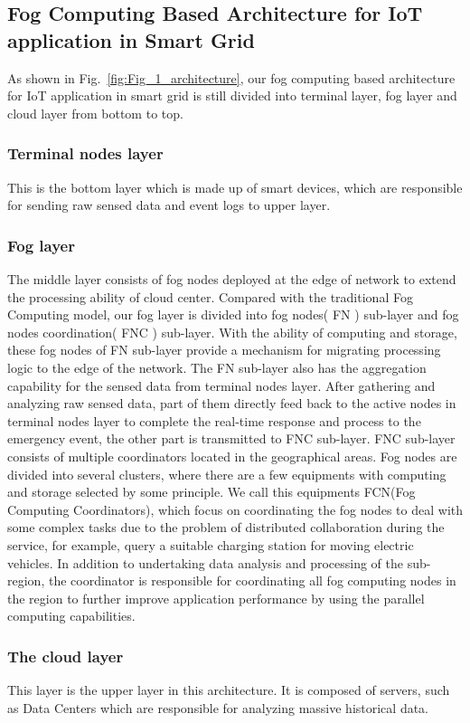\documentclass[conference]{IEEEtran}
\begin{document}
\subsection{Fog Computing Based Architecture for IoT application in Smart Grid}
As shown in Fig.~\ref{fig:Fig_1_architecture}, our fog computing based architecture for IoT application in smart grid is still divided into terminal layer, fog layer and cloud layer from bottom to top. 
\subsubsection{Terminal nodes layer} This is the bottom layer which is made up of smart devices, which are responsible for sending raw sensed data and event logs to upper layer.
\subsubsection{Fog layer} The middle layer consists of fog nodes deployed at the edge of network to extend the processing ability of cloud center. Compared with the traditional Fog Computing model, our fog layer is divided into fog nodes( FN ) sub-layer and fog nodes coordination( FNC ) sub-layer. With the ability of computing and storage, these fog nodes of FN sub-layer provide a mechanism for migrating processing logic to the edge of the network. The FN sub-layer also has the aggregation capability for the sensed data from terminal nodes layer. After gathering and analyzing raw sensed data, part of them directly feed back to the active nodes in terminal nodes layer to complete the real-time response and process to the emergency event, the other part is transmitted to FNC sub-layer. FNC sub-layer consists of multiple coordinators located in the geographical areas. Fog nodes are divided into several clusters, where there are a few equipments  with computing and storage selected by some principle. We call this equipments FCN(Fog Computing Coordinators), which focus on coordinating the fog nodes to deal with some complex tasks due to the problem of distributed collaboration during the service, for example, query a suitable charging station for moving electric vehicles. In addition to undertaking data analysis and processing of the sub-region, the coordinator is responsible for coordinating all fog computing nodes in the region to further improve application performance by using the parallel computing capabilities.
\subsubsection{The cloud layer} This layer is the upper layer in this architecture. It is composed of servers, such as Data Centers which are responsible for analyzing massive historical data. 
\end{document}
